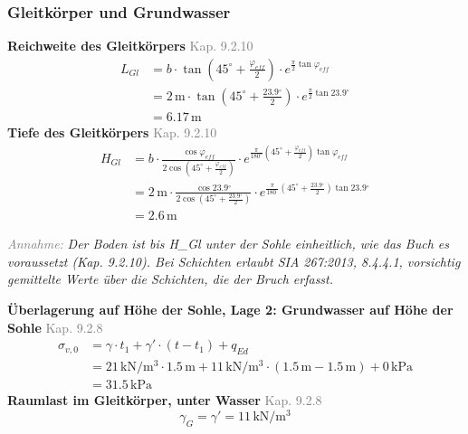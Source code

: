 \documentclass[11pt,a4paper]{article}
\newcommand{\normref}[1]{{\small\textcolor{gray}{#1}}}
\newcommand{\hinweis}[2]{\par\noindent\textcolor{gray}{\textit{#1:}} \textit{#2}\par}
\begin{document}
\subsubsection{Gleitkörper und Grundwasser}
\noindent\textbf{Reichweite des Gleitkörpers} \hfill \normref{Kap. 9.2.10}
\begin{equation*}
\begin{aligned}
  L_{Gl} &= b \cdot \tan\left(45^\circ + \frac{\varphi_{eff}}{2}\right) \cdot e^{\frac{\pi}{2} \tan \varphi_{eff}} \\
  &= 2\,\mathrm{m} \cdot \tan\left(45^\circ + \frac{23.9{}^{\circ}}{2}\right) \cdot e^{\frac{\pi}{2} \tan 23.9{}^{\circ}} \\
  &= 6.17\,\mathrm{m}
\end{aligned}
\end{equation*}
\noindent\textbf{Tiefe des Gleitkörpers} \hfill \normref{Kap. 9.2.10}
\begin{equation*}
\begin{aligned}
  H_{Gl} &= b \cdot \frac{\cos \varphi_{eff}}{2 \cos\left(45^\circ + \frac{\varphi_{eff}}{2}\right)} \cdot e^{\frac{\pi}{180^\circ}\left(45^\circ + \frac{\varphi_{eff}}{2}\right) \tan \varphi_{eff}} \\
  &= 2\,\mathrm{m} \cdot \frac{\cos 23.9{}^{\circ}}{2 \cos\left(45^\circ + \frac{23.9{}^{\circ}}{2}\right)} \cdot e^{\frac{\pi}{180^\circ}\left(45^\circ + \frac{23.9{}^{\circ}}{2}\right) \tan 23.9{}^{\circ}} \\
  &= 2.6\,\mathrm{m}
\end{aligned}
\end{equation*}
\hinweis{Annahme}{Der Boden ist bis H\_Gl unter der Sohle einheitlich, wie das Buch es voraussetzt (Kap. 9.2.10). Bei Schichten erlaubt SIA 267:2013, 8.4.4.1, vorsichtig gemittelte Werte über die Schichten, die der Bruch erfasst.}
\noindent\textbf{Überlagerung auf Höhe der Sohle, Lage 2: Grundwasser auf Höhe der Sohle} \hfill \normref{Kap. 9.2.8}
\begin{equation*}
\begin{aligned}
  \sigma_{v,0} &= \gamma \cdot t_1 + \gamma' \cdot \left(t - t_1\right) + q_{Ed} \\
  &= 21\,\mathrm{kN}/\mathrm{m}^{3} \cdot 1.5\,\mathrm{m} + 11\,\mathrm{kN}/\mathrm{m}^{3} \cdot \left(1.5\,\mathrm{m} - 1.5\,\mathrm{m}\right) + 0\,\mathrm{kPa} \\
  &= 31.5\,\mathrm{kPa}
\end{aligned}
\end{equation*}
\noindent\textbf{Raumlast im Gleitkörper, unter Wasser} \hfill \normref{Kap. 9.2.8}
\begin{equation*}
\gamma_G = \gamma' = 11\,\mathrm{kN}/\mathrm{m}^{3}
\end{equation*}
\end{document}
